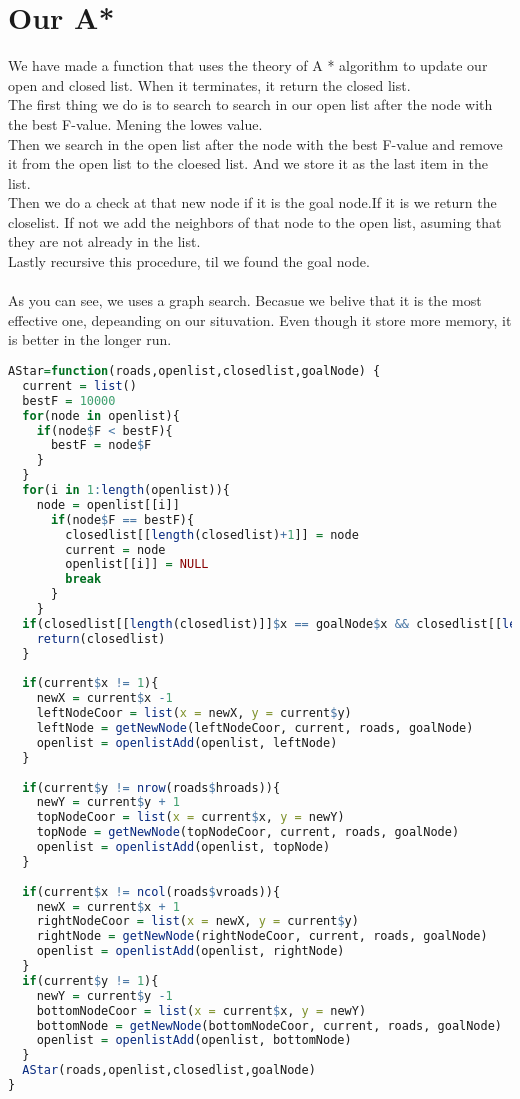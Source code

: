 \documentclass[12pt, a4paper]{article}
\begin{document}
\section{Our A*}
We have made a function that uses the theory of A * algorithm to update our open and closed list. When it terminates, it return the closed list.\\
The first thing we do is to search to search in our open list after the node with the best F-value. Mening the lowes value.\\
Then we search in the open list after the node with the best F-value and remove it from the open list to the cloesed list. And we store it as the last item in the list.\\
Then we do a check at that new node if it is the goal node.If it is we return the closelist. If not we add the neighbors of that node to the open list, asuming that they are not already in the list.\\
Lastly recursive this procedure, til we found the goal node.\\\\

As you can see, we uses a graph search. Becasue we belive that it is the most effective one, depeanding on our situvation. Even though it store more memory, it is better in the longer run.

\begin{lstlisting}[language=R]
AStar=function(roads,openlist,closedlist,goalNode) {
  current = list()
  bestF = 10000
  for(node in openlist){
    if(node$F < bestF){
      bestF = node$F
    } 
  }
  for(i in 1:length(openlist)){
    node = openlist[[i]]
      if(node$F == bestF){
        closedlist[[length(closedlist)+1]] = node
        current = node
        openlist[[i]] = NULL
        break
      } 
    }
  if(closedlist[[length(closedlist)]]$x == goalNode$x && closedlist[[length(closedlist)]]$y == goalNode$y){
    return(closedlist) 
  }
  
  if(current$x != 1){
    newX = current$x -1
    leftNodeCoor = list(x = newX, y = current$y)
    leftNode = getNewNode(leftNodeCoor, current, roads, goalNode)
    openlist = openlistAdd(openlist, leftNode)
  } 
  
  if(current$y != nrow(roads$hroads)){
    newY = current$y + 1
    topNodeCoor = list(x = current$x, y = newY)
    topNode = getNewNode(topNodeCoor, current, roads, goalNode)
    openlist = openlistAdd(openlist, topNode)
  } 
  
  if(current$x != ncol(roads$vroads)){
    newX = current$x + 1
    rightNodeCoor = list(x = newX, y = current$y)
    rightNode = getNewNode(rightNodeCoor, current, roads, goalNode)
    openlist = openlistAdd(openlist, rightNode)
  } 
  if(current$y != 1){
    newY = current$y -1
    bottomNodeCoor = list(x = current$x, y = newY)
    bottomNode = getNewNode(bottomNodeCoor, current, roads, goalNode)
    openlist = openlistAdd(openlist, bottomNode)
  }  
  AStar(roads,openlist,closedlist,goalNode)
}

\end{lstlisting}
\end{document}
